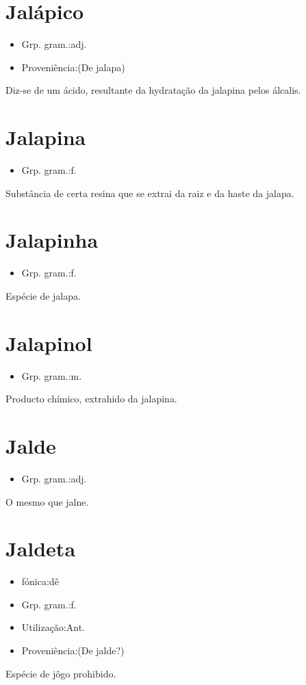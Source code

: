 \documentclass{article}
\begin{document}
\section{Jalápico}
\begin{itemize}
\item {Grp. gram.:adj.}
\end{itemize}
\begin{itemize}
\item {Proveniência:(De \textunderscore jalapa\textunderscore )}
\end{itemize}
Diz-se de um ácido, resultante da hydratação da jalapina pelos álcalis.
\section{Jalapina}
\begin{itemize}
\item {Grp. gram.:f.}
\end{itemize}
Substância de certa resina que se extrai da raiz e da haste da jalapa.
\section{Jalapinha}
\begin{itemize}
\item {Grp. gram.:f.}
\end{itemize}
Espécie de jalapa.
\section{Jalapinol}
\begin{itemize}
\item {Grp. gram.:m.}
\end{itemize}
Producto chímico, extrahido da jalapina.
\section{Jalde}
\begin{itemize}
\item {Grp. gram.:adj.}
\end{itemize}
O mesmo que \textunderscore jalne\textunderscore .
\section{Jaldeta}
\begin{itemize}
\item {fónica:dê}
\end{itemize}
\begin{itemize}
\item {Grp. gram.:f.}
\end{itemize}
\begin{itemize}
\item {Utilização:Ant.}
\end{itemize}
\begin{itemize}
\item {Proveniência:(De \textunderscore jalde\textunderscore ?)}
\end{itemize}
Espécie de jôgo prohibido.
\end{document}
